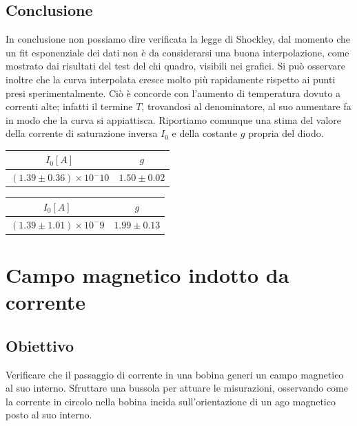 \documentclass[a4paper]{article}
\begin{document}
\subsection{Conclusione}
In conclusione non possiamo dire verificata la legge di Shockley, dal momento che un fit esponenziale dei dati non è da considerarsi una buona interpolazione, come mostrato dai risultati del test del chi quadro, visibili nei grafici. Si può osservare inoltre che la curva interpolata cresce molto più rapidamente rispetto ai punti presi sperimentalmente. Ciò è concorde con l'aumento di temperatura dovuto a correnti alte; infatti il termine \(T\), trovandosi al denominatore, al suo aumentare fa in modo che la curva si appiattisca. 
Riportiamo comunque una stima del valore della corrente di saturazione inversa \(I_0\) e della costante \( g \) propria del diodo. 
\begin{center}
\begin{tabular}{|c|c|}
\hline
$I_0[A]$ & $g$ \\
\hline
$(1.39 \pm 0.36)\times10^-10 $ & $1.50 \pm 0.02$ \\
\hline
\end{tabular}
\end{center}
\begin{center}
\begin{tabular}{|c|c|}
\hline
$I_0 [A]$ & $g$ \\
\hline
$(1.39 \pm 1.01)\times10^-9 $ & $1.99 \pm 0.13$ \\
\hline
\end{tabular}
\end{center}



\section{Campo magnetico indotto da corrente}
\subsection{Obiettivo}
Verificare che il passaggio di corrente in una bobina generi un campo magnetico al suo interno.
Sfruttare una bussola per attuare le misurazioni, osservando come la corrente in circolo nella bobina incida sull'orientazione di un ago magnetico posto al suo interno.
\end{document}
